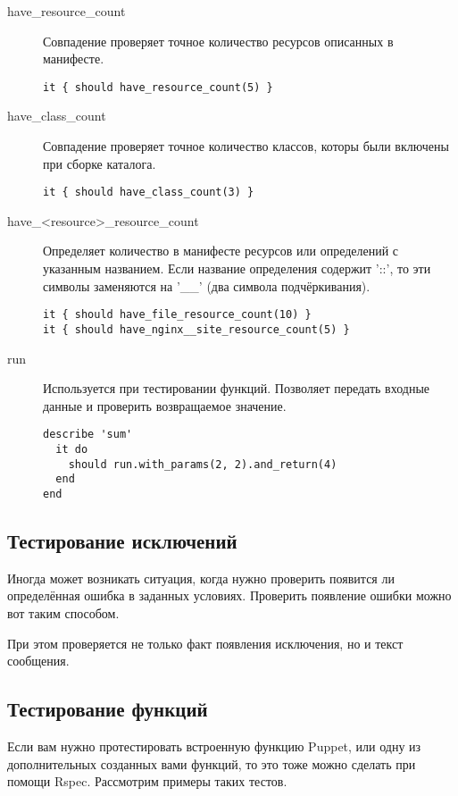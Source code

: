 \begin{description}
\item[have\_resource\_count]
Совпадение проверяет точное количество ресурсов описанных в манифесте.

\begin{lstlisting}
it { should have_resource_count(5) }
\end{lstlisting}

\item[have\_class\_count]
Совпадение проверяет точное количество классов, которы были включены при сборке каталога.

\begin{lstlisting}
it { should have_class_count(3) }
\end{lstlisting}

\item[have\_\textless{}resource\textgreater{}\_resource\_count]
Определяет количество в манифесте ресурсов или определений с указанным названием. Если название определения содержит '::', то эти символы заменяются на '\_\_' (два символа подчёркивания).

\begin{lstlisting}
it { should have_file_resource_count(10) }
it { should have_nginx__site_resource_count(5) }
\end{lstlisting}

\item[run]
Используется при тестировании функций. Позволяет передать входные данные и проверить возвращаемое значение.

\begin{lstlisting}
describe 'sum'
  it do
    should run.with_params(2, 2).and_return(4)
  end
end
\end{lstlisting}

\end{description}

\subsection{Тестирование исключений}

Иногда может возникать ситуация, когда нужно проверить появится ли определённая ошибка в заданных условиях. Проверить появление ошибки можно вот таким способом.



При этом проверяется не только факт появления исключения, но и текст сообщения.

\subsection{Тестирование функций}

Если вам нужно протестировать встроенную функцию Puppet, или одну из дополнительных созданных вами функций, то это тоже можно сделать при помощи Rspec. Рассмотрим примеры таких тестов.



